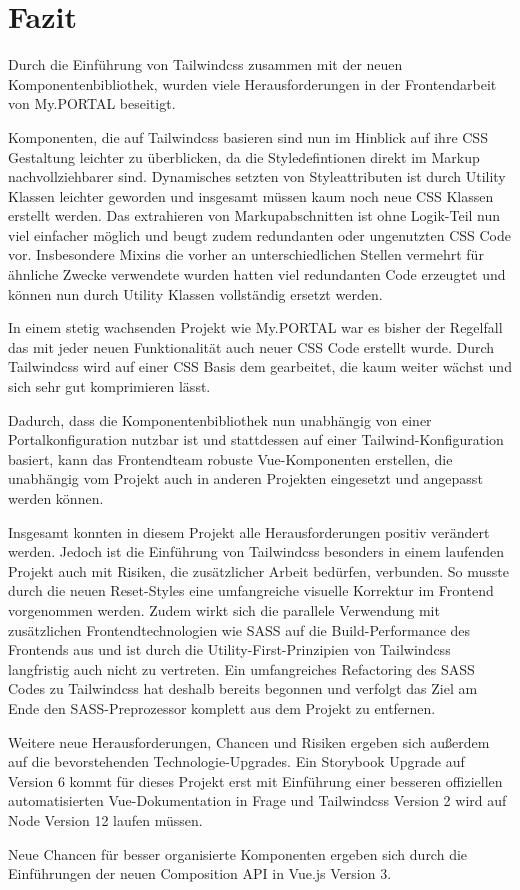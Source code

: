\chapter{Fazit}
\label{cha:Fazit}
Durch die Einführung von Tailwindcss zusammen mit der neuen Komponentenbibliothek, wurden viele Herausforderungen in der Frontendarbeit von My.PORTAL beseitigt.

Komponenten, die auf Tailwindcss basieren sind nun im Hinblick auf ihre CSS Gestaltung leichter zu überblicken, da die Styledefintionen direkt im Markup nachvollziehbarer sind. Dynamisches setzten von Styleattributen ist durch Utility Klassen leichter geworden und insgesamt müssen kaum noch neue CSS Klassen erstellt werden. Das extrahieren von Markupabschnitten ist ohne Logik-Teil nun viel einfacher möglich und  beugt zudem redundanten oder ungenutzten CSS Code vor. Insbesondere Mixins die vorher an unterschiedlichen Stellen vermehrt für ähnliche Zwecke verwendete wurden hatten viel redundanten Code erzeugtet und können nun durch Utility Klassen vollständig ersetzt werden.

In einem stetig wachsenden Projekt wie My.PORTAL war es bisher der Regelfall das mit jeder neuen Funktionalität auch neuer CSS Code erstellt wurde. Durch Tailwindcss wird auf einer CSS Basis dem gearbeitet, die kaum weiter wächst und sich sehr gut komprimieren lässt.

Dadurch, dass die Komponentenbibliothek nun unabhängig von einer Portalkonfiguration nutzbar ist und stattdessen auf einer Tailwind-Konfiguration basiert, kann das Frontendteam robuste Vue-Komponenten erstellen, die unabhängig vom Projekt auch in anderen Projekten eingesetzt und angepasst werden können.

Insgesamt konnten in diesem Projekt alle Herausforderungen positiv verändert werden. Jedoch ist die Einführung von Tailwindcss besonders in einem laufenden Projekt auch mit Risiken, die zusätzlicher Arbeit bedürfen, verbunden. So musste durch die neuen Reset-Styles eine umfangreiche visuelle Korrektur im Frontend vorgenommen werden. Zudem wirkt sich die parallele Verwendung mit zusätzlichen Frontendtechnologien wie SASS auf die Build-Performance des Frontends aus und ist durch die Utility-First-Prinzipien von Tailwindcss langfristig auch nicht zu vertreten. Ein umfangreiches Refactoring des SASS Codes zu Tailwindcss hat deshalb bereits begonnen und verfolgt das Ziel am Ende den SASS-Preprozessor komplett aus dem Projekt zu entfernen.

Weitere neue Herausforderungen, Chancen und Risiken ergeben sich außerdem auf die bevorstehenden Technologie-Upgrades. Ein Storybook Upgrade auf Version 6 kommt für dieses Projekt erst mit Einführung einer besseren offiziellen automatisierten Vue-Dokumentation in Frage und Tailwindcss Version 2 wird auf Node Version 12 laufen müssen.

Neue Chancen für besser organisierte Komponenten ergeben sich durch die Einführungen der neuen Composition API in Vue.js Version 3.
